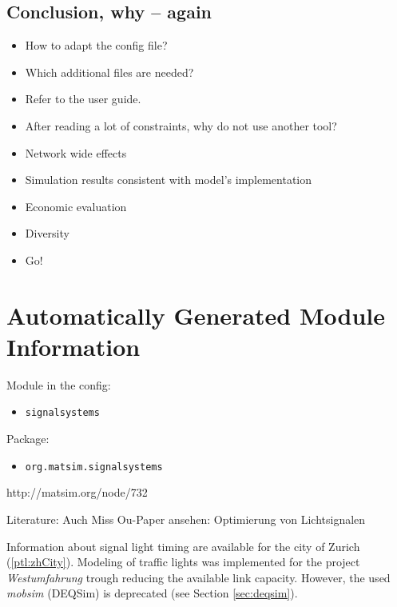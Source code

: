 \subsection{Conclusion, why -- again}

\begin{itemize}
	\item How to adapt the config file?
	\item Which additional files are needed?
	\item Refer to the user guide.
\end{itemize}

\begin{itemize}
	\item After reading a lot of constraints, why do not use another tool?
	\item Network wide effects
	\item Simulation results consistent with model's implementation 
	\item Economic evaluation
	\item Diversity 
	\item Go!
\end{itemize}

\section{Automatically Generated Module Information}
\label{sec:signals_config}
Module in the config: 
\begin{itemize}
	\item \lstinline|signalsystems|
\end{itemize}

Package:
\begin{itemize}
	\item \lstinline|org.matsim.signalsystems|
\end{itemize}

http://matsim.org/node/732

Literature: \citet[][]{GretherEtAl_ABMTRANS_2012, Grether_PhDThesis_2014, Neumann_MastersThesis_2008}
Auch Miss Ou-Paper ansehen: Optimierung von Lichtsignalen

\citet[][p.?]{BalmerEtAl_ResRep_bdktzrh_2009}


Information about signal light timing are available for the city of Zurich  \citep{STAPOZH-DAV_unpub_gtZH_2008} (\ref{ptl:zhCity}). Modeling of traffic lights was implemented for the project \emph{Westumfahrung} trough reducing the available link capacity. However, the used \emph{mobsim} (DEQSim) is deprecated (see Section \ref{sec:deqsim}).

